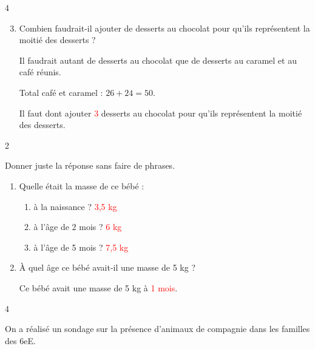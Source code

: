 \documentclass[a4paper]{book}
\begin{document}
{\begin{exerciceNote}{4}
        \begin{enumerate}
            \setcounter{enumi}{2}             
            \item Combien faudrait-il ajouter de desserts au chocolat pour qu'ils représentent la moitié des desserts ?
            
            Il faudrait autant de desserts au chocolat que de desserts au caramel et au café réunis.

            Total café et caramel : $26+24=50$.

            Il faut dont ajouter \textcolor{red}{3} desserts au chocolat pour qu'ils représentent la moitié des desserts.
        \end{enumerate}
    \end{exerciceNote}


    \begin{exerciceNote}{2}
        \begin{minipage}{0.5\linewidth}
            Donner juste la réponse sans faire de phrases.
            \begin{enumerate}
                \item Quelle était la masse de ce bébé :
                \begin{enumerate}
                    \item à la naissance ? \textcolor{red}{3,5 kg}
                    \item à l'âge de 2 mois ? \textcolor{red}{6 kg}
                    \item à l'âge de 5 mois ? \textcolor{red}{7,5 kg}
                \end{enumerate}
                \item À quel âge ce bébé avait-il une masse de 5 kg ? 

                Ce bébé avait une masse de 5 kg à \textcolor{red}{1 mois}.
            \end{enumerate}
        \end{minipage}
        \hfill
        \begin{minipage}{0.49\linewidth}
            \begin{center}
            \end{center}
        \end{minipage}   
    \end{exerciceNote}


    \begin{exerciceNote}{4}  
        \begin{minipage}{0.4\linewidth}
            \begin{center}
            \end{center}
        \end{minipage}
        \hfill
        \begin{minipage}{0.55\linewidth}
            On a réalisé un sondage sur la présence d'animaux de compagnie dans les familles des 6eE.
            

\end{minipage}
\end{exerciceNote}}
\end{document}
